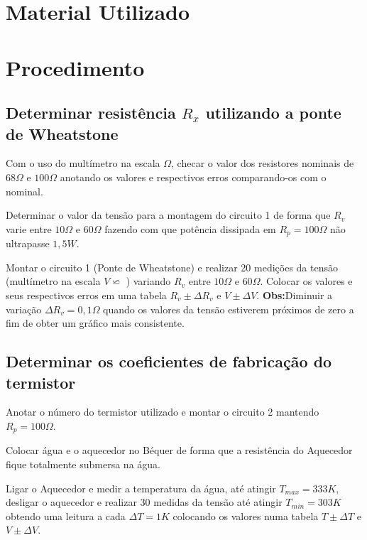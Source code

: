 \documentclass{article}
\newcommand\tab[1][0.6cm]{\hspace*{#1}}
\begin{document}
    
    \section{Material Utilizado}
        
    \section{Procedimento}
        \subsection{Determinar resistência $R_{x}$ utilizando a ponte de Wheatstone}
            \tab Com o uso do multímetro na escala $\Omega$, checar o valor dos resistores nominais de
            $68\Omega$ e $100\Omega$ anotando os valores e respectivos erros comparando-os com o nominal.
            \par
            Determinar o valor da tensão para a montagem do circuito 1 de forma que $R_{v}$ varie entre $10\Omega$ e $60\Omega$
            fazendo com que potência dissipada em $R_{p}=100\Omega$ não ultrapasse $1,5W$.
            \par
            Montar o circuito 1 (Ponte de Wheatstone) e realizar 20 medições da tensão (multímetro na escala $V\backsimeq$ )
            variando $R_{v}$ entre $10\Omega$ e $60\Omega$. Colocar os valores e seus respectivos erros em uma tabela
            $R_{v}\pm\Delta R_{v}$ e $V\pm\Delta V$.\newline
            \textbf{Obs:}Diminuir a variação $\Delta R_{v}=0,1\Omega$ quando os valores da tensão estiverem próximos de zero a fim de obter um
            gráfico mais consistente.
        \subsection{Determinar os coeficientes de fabricação do termistor}
            \tab Anotar o número do termistor utilizado e montar o circuito 2 mantendo $R_{p}=100\Omega$.
            \par
            Colocar água e o aquecedor no Béquer de forma que a resistência do Aquecedor fique totalmente submersa na água.
            \par
            Ligar o Aquecedor e medir a temperatura da água, até atingir $T_{max}=333K$, desligar o aquecedor e realizar 30 medidas
            da tensão até atingir $T_{min}=303K$ obtendo uma leitura a cada $\Delta T = 1K$ colocando os valores numa tabela $T\pm\Delta T$
            e $V\pm\Delta V$.
    
\end{document}
